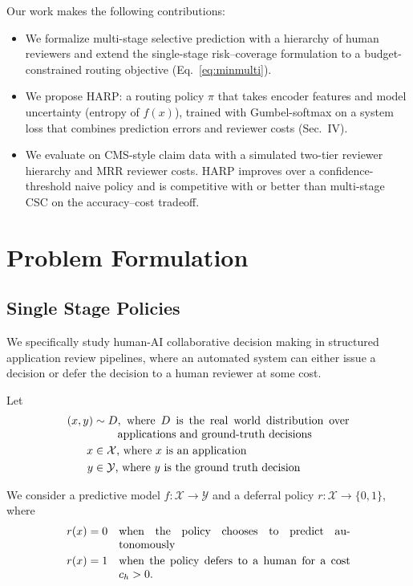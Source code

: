 \documentclass[conference]{IEEEtran}
\begin{document}
Our work makes the following contributions:
\begin{itemize}
 \item We formalize multi-stage selective prediction with a hierarchy of human reviewers and extend the single-stage risk--coverage formulation to a budget-constrained routing objective (Eq.~\eqref{eq:minmulti}).
 \item We propose HARP: a routing policy $\pi$ that takes encoder features and model uncertainty (entropy of $f(x)$), trained with Gumbel-softmax on a system loss that combines prediction errors and reviewer costs (Sec.~IV).
 \item We evaluate on CMS-style claim data with a simulated two-tier reviewer hierarchy and MRR reviewer costs. HARP improves over a confidence-threshold naive policy and is competitive with or better than multi-stage CSC on the accuracy--cost tradeoff.
\end{itemize}

\section{Problem Formulation}

\subsection{Single Stage Policies}

We specifically study human-AI collaborative decision making in structured application 
review pipelines, where an automated system can either issue a decision or defer the 
decision to a human reviewer at some cost.

Let 
\[
\begin{aligned}
(x, y) &\sim D \parbox[t]{0.6\linewidth}{, where $D$ is the real world distribution over applications and ground-truth decisions}\\
x &\in \mathcal{X} \parbox[t]{0.6\linewidth}{, where $x$ is an application}\\
y &\in \mathcal{Y} \parbox[t]{0.6\linewidth}{, where $y$ is the ground truth decision}
\end{aligned}
\]

We consider a predictive model $f: \mathcal{X} \rightarrow \mathcal{Y}$ and a 
deferral policy $r: \mathcal{X} \rightarrow \{0, 1\}$, where
\[
\begin{aligned}
r(x) &= 0 && \parbox[t]{0.6\linewidth}{when the policy chooses to predict autonomously} \\
r(x) &= 1 && \parbox[t]{0.6\linewidth}{when the policy defers to a human for a cost $c_{h} > 0$.}
\end{aligned}
\]
\end{document}
